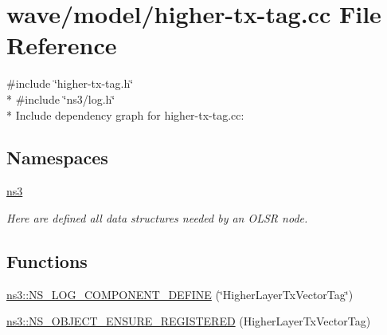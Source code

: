 \hypertarget{higher-tx-tag_8cc}{}\section{wave/model/higher-\/tx-\/tag.cc File Reference}
\label{higher-tx-tag_8cc}
{\ttfamily \#include \char`\"{}higher-\/tx-\/tag.\+h\char`\"{}}\\*
{\ttfamily \#include \char`\"{}ns3/log.\+h\char`\"{}}\\*
Include dependency graph for higher-\/tx-\/tag.cc\+:
\subsection*{Namespaces}
\begin{DoxyCompactItemize}
\item 
 \hyperlink{namespacens3}{ns3}
\begin{DoxyCompactList}\small\item\em Here are defined all data structures needed by an O\+L\+SR node. \end{DoxyCompactList}\end{DoxyCompactItemize}
\subsection*{Functions}
\begin{DoxyCompactItemize}
\item 
\hyperlink{namespacens3_a38e6c3362adb7689ec9c4cb35da2ede0}{ns3\+::\+N\+S\+\_\+\+L\+O\+G\+\_\+\+C\+O\+M\+P\+O\+N\+E\+N\+T\+\_\+\+D\+E\+F\+I\+NE} (\char`\"{}Higher\+Layer\+Tx\+Vector\+Tag\char`\"{})
\item 
\hyperlink{namespacens3_a2728034f0005feea41462bef6dd3b00b}{ns3\+::\+N\+S\+\_\+\+O\+B\+J\+E\+C\+T\+\_\+\+E\+N\+S\+U\+R\+E\+\_\+\+R\+E\+G\+I\+S\+T\+E\+R\+ED} (Higher\+Layer\+Tx\+Vector\+Tag)
\end{DoxyCompactItemize}
